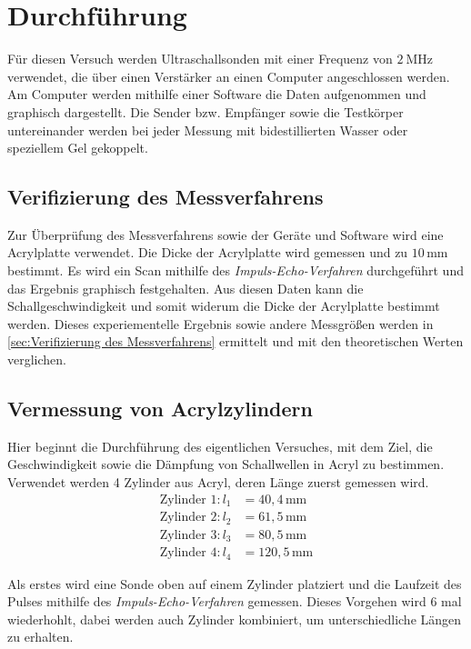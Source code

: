 \section{Durchführung}
\label{sec:Durchführung}
Für diesen Versuch werden Ultraschallsonden mit einer Frequenz von $\qty{2}{\mega\hertz}$ verwendet,
die über einen Verstärker an einen Computer angeschlossen werden.
Am Computer werden mithilfe einer Software die Daten aufgenommen und graphisch dargestellt.
Die Sender bzw. Empfänger sowie die Testkörper untereinander werden bei jeder Messung mit bidestillierten Wasser oder
speziellem Gel gekoppelt.

\subsection{Verifizierung des Messverfahrens}

Zur Überprüfung des Messverfahrens sowie der Geräte und Software wird eine Acrylplatte verwendet.
Die Dicke der Acrylplatte wird gemessen und zu $10\,\unit{\milli\metre}$ bestimmt.
Es wird ein Scan mithilfe des \textit{Impuls-Echo-Verfahren} durchgeführt und das Ergebnis graphisch festgehalten.
Aus diesen Daten kann die Schallgeschwindigkeit und somit widerum die Dicke der Acrylplatte bestimmt werden.
Dieses experiementelle Ergebnis sowie andere Messgrößen werden in \ref{sec:Verifizierung des Messverfahrens} ermittelt
und mit den theoretischen Werten verglichen.

\subsection{Vermessung von Acrylzylindern}

Hier beginnt die Durchführung des eigentlichen Versuches, mit dem Ziel, die Geschwindigkeit sowie die Dämpfung
von Schallwellen in Acryl zu bestimmen.
Verwendet werden 4 Zylinder aus Acryl, deren Länge zuerst gemessen wird.
\begin{align*}
    \text{Zylinder 1:}\,l_1&=40,4\,\unit{\milli\metre} \\
    \text{Zylinder 2:}\,l_2&=61,5\,\unit{\milli\metre} \\
    \text{Zylinder 3:}\,l_3&=80,5\,\unit{\milli\metre} \\
    \text{Zylinder 4:}\,l_4&=120,5\,\unit{\milli\metre}
\end{align*}

Als erstes wird eine Sonde oben auf einem Zylinder platziert und die Laufzeit des Pulses mithilfe des \textit{Impuls-Echo-Verfahren}
gemessen. Dieses Vorgehen wird 6 mal wiederhohlt, dabei werden auch Zylinder kombiniert, um unterschiedliche Längen zu erhalten.

